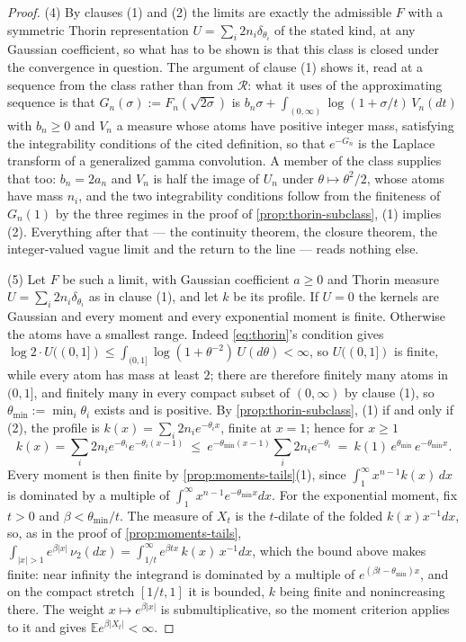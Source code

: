 \begin{proof}
(4) By clauses (1) and (2) the limits are exactly the admissible $F$ with a symmetric Thorin
representation $U = \sum_i 2n_i\delta_{\theta_i}$ of the stated kind, at any Gaussian coefficient,
so what has to be shown is that this class is closed under the convergence in question. The
argument of clause (1) shows it, read at a sequence from the class rather than from $\mathcal{R}$:
what it uses of the approximating sequence is that $G_n(\sigma) := F_n(\sqrt{2\sigma})$ is
$b_n\sigma + \int_{(0,\infty)}\log(1+\sigma/t)\,V_n(dt)$ with $b_n \ge 0$ and $V_n$ a measure whose
atoms have positive integer mass, satisfying the integrability conditions of the cited definition,
so that $e^{-G_n}$ is the Laplace transform of a generalized gamma convolution. A member of the
class supplies that too: $b_n = 2a_n$ and $V_n$ is half the image of $U_n$ under
$\theta \mapsto \theta^2/2$, whose atoms have mass $n_i$, and the two integrability conditions
follow from the finiteness of $G_n(1)$ by the three regimes in the proof of
\ref{prop:thorin-subclass}, (1) implies (2). Everything after that --- the continuity theorem, the
closure theorem, the integer-valued vague limit and the return to the line --- reads nothing else.

(5) Let $F$ be such a limit, with Gaussian coefficient $a \ge 0$ and Thorin measure
$U = \sum_i 2n_i\delta_{\theta_i}$ as in clause (1), and let $k$ be its profile. If $U = 0$ the
kernels are Gaussian and every moment and every exponential moment is finite. Otherwise the atoms
have a smallest range. Indeed \ref{eq:thorin}'s condition gives
$\log 2 \cdot U((0,1]) \le \int_{(0,1]}\log(1+\theta^{-2})\,U(d\theta) < \infty$, so $U((0,1])$ is
finite, while every atom has mass at least $2$; there are therefore finitely many atoms in
$(0,1]$, and finitely many in every compact subset of $(0,\infty)$ by clause (1), so
$\theta_{\min} := \min_i\theta_i$ exists and is positive. By \ref{prop:thorin-subclass}, (1) if
and only if (2), the profile is $k(x) = \sum_i 2n_ie^{-\theta_ix}$, finite at $x = 1$; hence for
$x \ge 1$
\[
  k(x) = \sum_i 2n_ie^{-\theta_i}e^{-\theta_i(x-1)}
   \ \le\ e^{-\theta_{\min}(x-1)}\sum_i 2n_ie^{-\theta_i}
   \ =\ k(1)\,e^{\theta_{\min}}\,e^{-\theta_{\min}x} .
\]
Every moment is then finite by \ref{prop:moments-tails}(1), since
$\int_1^\infty x^{n-1}k(x)\,dx$ is dominated by a multiple of
$\int_1^\infty x^{n-1}e^{-\theta_{\min}x}dx$. For the exponential moment, fix $t > 0$ and
$\beta < \theta_{\min}/t$. The \Levy{} measure of $X_t$ is the $t$-dilate of the folded
$k(x)x^{-1}dx$, so, as in the proof of \ref{prop:moments-tails},
$\int_{|x|>1}e^{\beta|x|}\,\nu_2(dx) = \int_{1/t}^\infty e^{\beta t x}\,k(x)\,x^{-1}dx$, which the
bound above makes finite: near infinity the integrand is dominated by a multiple of
$e^{(\beta t - \theta_{\min})x}$, and on the compact stretch $[1/t, 1]$ it is bounded, $k$ being
finite and nonincreasing there. The weight $x \mapsto e^{\beta|x|}$ is submultiplicative, so the
moment criterion applies to it and gives $\mathbb{E}e^{\beta|X_t|} < \infty$.


\end{proof}
